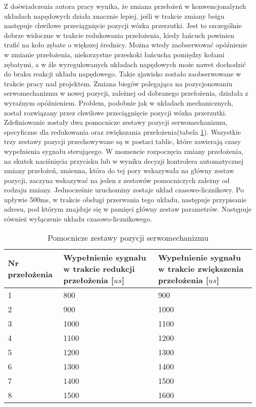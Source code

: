 Z doświadczenia autora pracy wynika, że zmiana przełożeń w konwencjonalynch układach napędowych działa znacznie lepiej, jeśli w trakcie zmiany beigu następuje chwilowe przeciągnięcie pozycji wózka przerzutki. Jest to szczególnie dobrze widoczne w trakcie redukowania przełożenia, kiedy łańcuch powinien trafić na koło zębate o większej średnicy. Można wtedy zaobserwować opóźnienie w zmianie przełożenia, niekorzystne przeskoki łańcucha pomiędzy kołami zębatymi, a w źle wyregulowanych układach napędowych może nawet dochodzić do braku reakcji układu napędowego. Takie zjawisko zostało zaobserwowane w trakcie pracy nad projektem. Zmiana biegów polegająca na pozycjonowaniu serwomechanizmu w nowej pozycji, zależnej od dobranego przełożenia, działała z wyraźnym opóźnieniem. Problem, podobnie jak w układach mechanicznych, został rozwiązany przez chwilowe przeciągnięcie pozycji wózka przerzutki. Zdefiniowanie zostały dwa pomocnicze zestawy pozycji serwomechanizmu, specyficzne dla redukowania oraz zwiększania przełożenia(tabela \ref{tab:przelozeniaPomocniczne}). Wszystkie trzy zestawy pozycji przechowywane są w postaci tablic, które zawierają czasy wypełnienia sygnału sterującego. W momencie rozpoczęcia zmiany przełożenia, na skutek naciśnięcia przycisku lub w wyniku decyzji kontrolera automatycznej zmiany przełożeń, zmienna, która do tej pory wskazywała na główny zestaw pozycji, zaczyna wskazywać na jeden z zestawów pomocniczych zależny od rodzaju zmiany. Jednocześnie uruchominy zostaje układ czasowo-licznikowy. Po upływie 500ms, w trakcie obsługi przerwania tego układu, następuje przypisanie adresu, pod którym znajduje się w pamięci główny zestaw parametrów. Następuje również wyłączenie układu czasowo-licznikowego. 


\begin{table}[h]
    \caption{Pomocnicze zestawy pozycji serwomechanizmu}
    \begin{center}
		\label{tab:przelozeniaPomocniczne}
		\begin{tabular}{|p{2.5cm}|p{5cm}|p{5cm}|}
			\hline
 			Nr przełożenia & Wypełnienie sygnału w trakcie redukcji przełożenia [$us$] & 
Wypełnienie sygnału w trakcie zwiększenia przełożenia [$us$] \\
 			\hline
 			1 & 800 & 900 \\  
			2 & 900 & 1000 \\
			3 & 1000 & 1100 \\  
			4 & 1100 & 1200 \\  
			5 & 1200 & 1300 \\  
			6 & 1300 & 1400 \\  
			7 & 1400 & 1500 \\  
			8 & 1500 & 1600 \\  
			\hline
		\end{tabular}
	\end{center}
\end{table}
